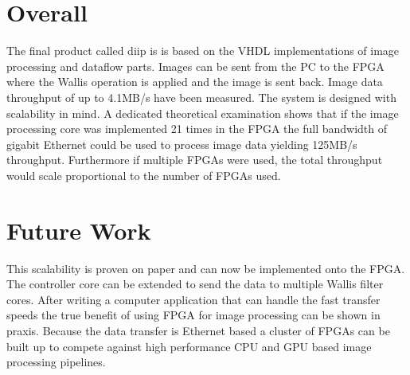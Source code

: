 \section{Overall}
The final product called \gls{diip} is is based on the VHDL implementations of
image processing and dataflow parts. Images can be sent from the PC to the FPGA
where
the Wallis operation is applied and the image is sent back. Image data
throughput of up to 4.1MB/s have been measured. The system is designed with
scalability in mind. A dedicated theoretical examination shows that if the
image processing core was implemented 21 times in the FPGA the full bandwidth of
gigabit Ethernet could be used to process image data yielding 125MB/s
throughput. Furthermore if multiple FPGAs were used, the total throughput would
scale proportional to the number of FPGAs used.

%
%
\section{Future Work}
This scalability is proven on paper and can now be implemented onto the FPGA.
The controller core can be extended to send the data to multiple Wallis filter
cores. After writing a computer application that can handle the fast transfer
speeds the true benefit of using FPGA for image processing can be shown in
praxis. Because the data transfer is Ethernet based a cluster of FPGAs can be
built up to compete against high performance CPU and GPU based image processing
pipelines.

